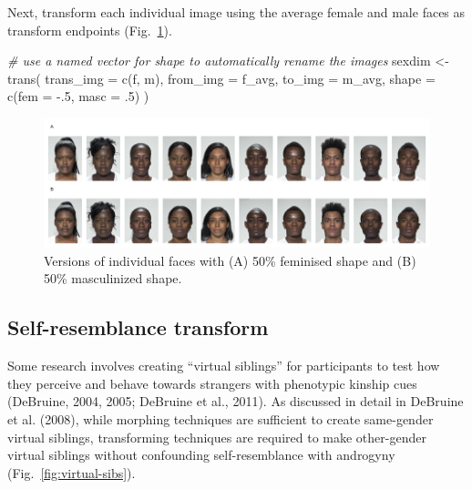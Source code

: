 \documentclass[
  doc,floatsintext]{apa6}
\newenvironment{Shaded}{\begin{snugshade}}{\end{snugshade}}
\newcommand{\AttributeTok}[1]{\textcolor[rgb]{0.77,0.63,0.00}{#1}}
\newcommand{\CommentTok}[1]{\textcolor[rgb]{0.56,0.35,0.01}{\textit{#1}}}
\newcommand{\DecValTok}[1]{\textcolor[rgb]{0.00,0.00,0.81}{#1}}
\newcommand{\FunctionTok}[1]{\textcolor[rgb]{0.00,0.00,0.00}{#1}}
\newcommand{\NormalTok}[1]{#1}
\newcommand{\OtherTok}[1]{\textcolor[rgb]{0.56,0.35,0.01}{#1}}
\newcommand{\SpecialCharTok}[1]{\textcolor[rgb]{0.00,0.00,0.00}{#1}}
\begin{document}
Next, transform each individual image using the average female and male faces as transform endpoints (Fig.~\ref{fig:sexdim-transform}).

\begin{Shaded}
\begin{Highlighting}[]
\CommentTok{\# use a named vector for shape to automatically rename the images}
\NormalTok{sexdim }\OtherTok{\textless{}{-}} \FunctionTok{trans}\NormalTok{(}
  \AttributeTok{trans\_img =} \FunctionTok{c}\NormalTok{(f, m),}
  \AttributeTok{from\_img =}\NormalTok{ f\_avg,}
  \AttributeTok{to\_img =}\NormalTok{ m\_avg,}
  \AttributeTok{shape =} \FunctionTok{c}\NormalTok{(}\AttributeTok{fem =} \SpecialCharTok{{-}}\NormalTok{.}\DecValTok{5}\NormalTok{, }\AttributeTok{masc =}\NormalTok{ .}\DecValTok{5}\NormalTok{)}
\NormalTok{)}
\end{Highlighting}
\end{Shaded}



\begin{figure}
\includegraphics[width=1\linewidth]{index_files/figure-latex/sexdim-transform-1} \caption{Versions of individual faces with (A) 50\% feminised shape and (B) 50\% masculinized shape.}\label{fig:sexdim-transform}
\end{figure}

\hypertarget{self-resemblance-transform}{%
\subsection{Self-resemblance transform}\label{self-resemblance-transform}}

Some research involves creating ``virtual siblings'' for participants to test how they perceive and behave towards strangers with phenotypic kinship cues (DeBruine, 2004, 2005; DeBruine et al., 2011). As discussed in detail in DeBruine et al. (2008), while morphing techniques are sufficient to create same-gender virtual siblings, transforming techniques are required to make other-gender virtual siblings without confounding self-resemblance with androgyny (Fig.~\ref{fig:virtual-sibs}).
\end{document}
